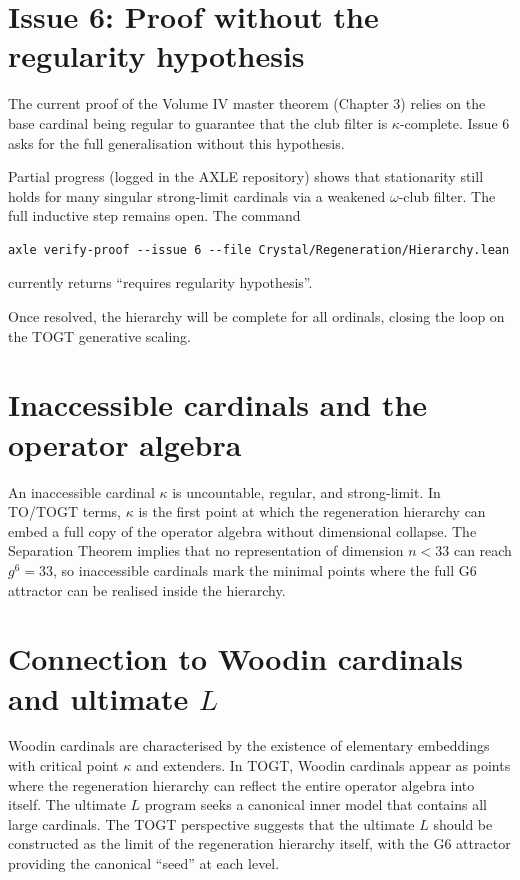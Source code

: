 \documentclass[19pt]{book}
\theoremstyle{plain}
\theoremstyle{definition}
\theoremstyle{remark}
\begin{document}
\begin{enumerate}
\section{Issue 6: Proof without the regularity hypothesis}

The current proof of the Volume IV master theorem (Chapter 3) relies on the base cardinal being regular to guarantee that the club filter is \(\kappa\)-complete. Issue 6 asks for the full generalisation without this hypothesis.

Partial progress (logged in the AXLE repository) shows that stationarity still holds for many singular strong-limit cardinals via a weakened \(\omega\)-club filter. The full inductive step remains open. The command

\begin{verbatim}
axle verify-proof --issue 6 --file Crystal/Regeneration/Hierarchy.lean
\end{verbatim}

currently returns “requires regularity hypothesis”.

Once resolved, the hierarchy will be complete for all ordinals, closing the loop on the TOGT generative scaling.

\section{Inaccessible cardinals and the operator algebra}

An inaccessible cardinal \(\kappa\) is uncountable, regular, and strong-limit. In TO/TOGT terms, \(\kappa\) is the first point at which the regeneration hierarchy can embed a full copy of the operator algebra without dimensional collapse. The Separation Theorem implies that no representation of dimension \(n < 33\) can reach \(g^6 = 33\), so inaccessible cardinals mark the minimal points where the full G6 attractor can be realised inside the hierarchy.

\section{Connection to Woodin cardinals and ultimate \(L\)}

Woodin cardinals are characterised by the existence of elementary embeddings with critical point \(\kappa\) and extenders. In TOGT, Woodin cardinals appear as points where the regeneration hierarchy can reflect the entire operator algebra into itself. The ultimate \(L\) program seeks a canonical inner model that contains all large cardinals. The TOGT perspective suggests that the ultimate \(L\) should be constructed as the limit of the regeneration hierarchy itself, with the G6 attractor providing the canonical “seed” at each level.


\end{enumerate}
\end{document}
